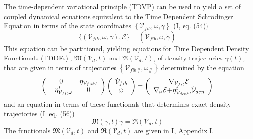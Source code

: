 \documentclass[aps,preprint]{revtex4}%
\begin{document}
The time-dependent variational principle (TDVP) can be used to yield a set of
coupled dynamical equations equivalent to the Time Dependent Schr\"{o}dinger
Equation in terms of the state coordinates $\left\{  \mathcal{V}_{fib}%
,\omega,\mathcal{\gamma}\right\}  $ (I, eq. (54))
\begin{equation}
\{(\mathcal{V}_{fib},\omega,\gamma),\mathcal{E}\}=(\mathcal{\dot{V}}%
_{fib},\dot{\omega},\dot{\gamma}) \label{Vomegagammaeom}%
\end{equation}
This equation can be partitioned, yielding equations for Time Dependent
Density Functionals (TDDFs) , $\mathfrak{M}\left(  \mathcal{V}_{d},t\right)  $
and $\mathfrak{R}\left(  \mathcal{V}_{d},t\right)  $, of density trajectories
$\gamma\left(  t\right)  ,$ that are given in terms of trajectories $\left\{
\mathcal{V}_{fib\,\#},\omega_{\#}\right\}  $ determined by the equation
\begin{equation}
\left(
\begin{array}
[c]{cc}%
0 & \eta_{\mathcal{V}_{fib}\omega}\\
-\eta_{\mathcal{V}_{fib}\omega}^{t} & 0
\end{array}
\right)  \left(
\begin{array}
[c]{c}%
\mathcal{\dot{V}}_{fib}\\
\dot{\omega}%
\end{array}
\right)  =\left(
\begin{array}
[c]{c}%
\nabla_{\mathcal{V}_{fib}}\mathcal{E}\\
\nabla_{\omega}\mathcal{E+}\eta_{\mathcal{V}_{den}\omega}^{t}\mathcal{\dot{V}%
}_{den}%
\end{array}
\right)
\end{equation}
and an equation in terms of these functionals that determines exact density
trajectories (I, eq. (56))
\begin{equation}
\mathfrak{M}\left(  \mathcal{\gamma},t\right)  \dot{\gamma}=\mathfrak{R}%
\left(  \mathcal{V}_{d},t\right)  \label{gammadot2}%
\end{equation}
The functionals $\mathfrak{M}\left(  \mathcal{V}_{d},t\right)  $ and
$\mathfrak{R}\left(  \mathcal{V}_{d},t\right)  $ are given in I, Appendix I.
\end{document}
